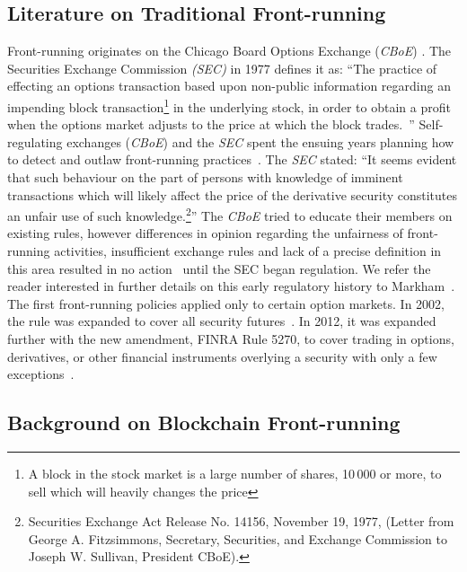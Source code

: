 \subsection{Literature on Traditional Front-running}\label{traditionalFrontrunning}
Front-running originates on the Chicago Board Options Exchange (\textit{CBoE}) \cite{markham1988front}. The Securities Exchange Commission \textit{(SEC)} in 1977 defines it as: ``The practice of effecting an options transaction based upon non-public information regarding an impending block transaction\footnote{A block in the stock market is a large number of shares, 10\,000 or more, to sell which will heavily changes the price} in the underlying stock, in order to obtain a profit when the options market adjusts to the price at which the block trades.~\cite{sec1978optionsmarket}'' Self-regulating exchanges (\eg \textit{CBoE}) and the \textit{SEC} spent the ensuing years planning how to detect and outlaw front-running practices~\cite{markham1988front}. The \textit{SEC} stated: ``It seems evident that such behaviour on the part of persons with knowledge of imminent transactions which will likely affect the price of the derivative security constitutes an unfair use of such knowledge.\footnote{Securities Exchange Act Release No. 14156, November 19, 1977, (Letter from George A. Fitzsimmons, Secretary, Securities, and Exchange Commission to Joseph W. Sullivan, President  CBoE).}'' The \textit{CBoE} tried to educate their members on existing rules, however differences in opinion regarding the unfairness of front-running activities, insufficient exchange rules and lack of a precise definition in this area resulted in no action~\cite{sec1978optionsmarket} until the SEC began regulation. We refer the reader interested in further details on this early regulatory history to Markham~\cite{markham1988front}. The first front-running policies applied only to certain option markets. In 2002, the rule was expanded to cover all security futures~\cite{finra_2002}. In 2012, it was expanded further with the new amendment, FINRA Rule 5270, to cover trading in options, derivatives, or other financial instruments overlying a security with only a few exceptions~\cite{sec2012frontrunning, finra_2012}.

\subsection{Background on Blockchain Front-running} \label{sec:Front Running on the Blockchains}

